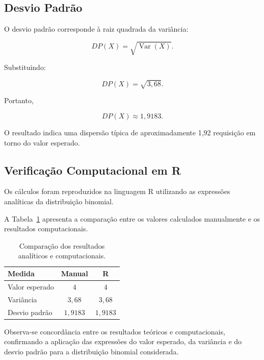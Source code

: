 \documentclass[12pt,a4paper]{article}
\begin{document}
\subsection{Desvio Padrão}

O desvio padrão corresponde à raiz quadrada da variância:

\[
DP(X)=\sqrt{\operatorname{Var}(X)}.
\]

Substituindo:

\[
DP(X)=\sqrt{3{,}68}.
\]

Portanto,

\[
\boxed{DP(X)\approx 1{,}9183}.
\]

O resultado indica uma dispersão típica de aproximadamente 1,92 requisição em torno do valor esperado.

\subsection{Verificação Computacional em R}

Os cálculos foram reproduzidos na linguagem R utilizando as expressões analíticas da distribuição binomial.

A Tabela~\ref{tab:resultados} apresenta a comparação entre os valores calculados manualmente e os resultados computacionais.

\begin{table}[h]
\centering
\begin{tabular}{lcc}
\hline
\textbf{Medida} & \textbf{Manual} & \textbf{R} \\
\hline
Valor esperado & $4$ & $4$ \\
Variância & $3{,}68$ & $3{,}68$ \\
Desvio padrão & $1{,}9183$ & $1{,}9183$ \\
\hline
\end{tabular}
\caption{Comparação dos resultados analíticos e computacionais.}
\label{tab:resultados}
\end{table}

Observa-se concordância entre os resultados teóricos e computacionais, confirmando a aplicação das expressões do valor esperado, da variância e do desvio padrão para a distribuição binomial considerada.
\end{document}
